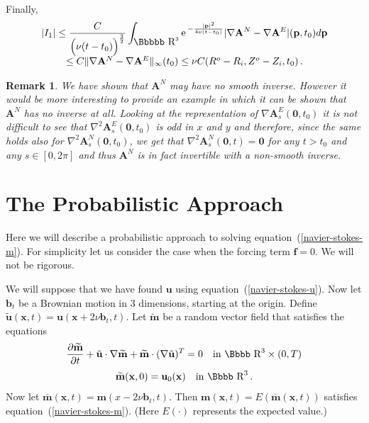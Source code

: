 \documentclass[12pt,twoside]{article}
\newcommand{\bA}{\mathbf{A}}
\newtheorem{rema}{Remark}[section]
\newcommand {\ee}{{\rm e}\,}
\newcommand {\rtt}{\mbox{\Bbbbb R}}
\newcommand {\rdd}{\mbox{\Bbbb R}}
\newcommand {\bnul}{{\mathbf {0}}}
\newcommand {\bu}{{\mathbf{u}}}
\newcommand {\bff}{{\mathbf{f}}}
\newcommand {\bx}{{\mathbf{x}}}
\newcommand {\bm}{{\mathbf{m}}}
\newcommand {\bb}{{\mathbf{b}}}
\newcommand {\bp}{{\mathbf{p}}}
\newcommand {\pder}[2]{\frac {\partial #1}{\partial #2}}
\def\kondemo{\hfill \vrule width7pt height7pt depth0pt}
\begin{document}
Finally,
$$
\begin{array}{c}
\displaystyle |I_1|  \leq \frac{C}{\Big(\nu(t-t_0)\Big)^{\frac 32}} \int_{\rtt^3} \ee^{-\frac
{|\bp|^2}{4\nu (t-t_0)}} |\nabla \bA^N - \nabla \bA^E|(\bp,t_0) d\bp \\[6pt]
\leq
C \|\nabla \bA^N - \nabla \bA^E\|_\infty(t_0) \leq \nu C(R^o-R_i, Z^o-Z_i, t_0)\,.
\end{array}
$$
\kondemo

\begin{rema} \label {r 5.2}
{\rm We have shown that $\bA^N$ may have no smooth inverse.  However it would be
more interesting to provide an example in which it can be shown that
$\bA^N$ has no inverse at all.
Looking at the representation of $\nabla \bA^E_s(\bnul, t_0)$ it is not 
difficult to see 
that $\nabla^2 \bA_s^E(\bnul, t_0)$ is odd in $x$ and $y$ and therefore, 
since
the same holds also for $\nabla^2 \bA_s^N(\bnul, t_0)$, we get
that  $\nabla^2 \bA_s^N(\bnul, t) = \bnul$ for any $t>t_0$ and any $s \in 
[0,2\pi]$ and thus
$\bA^N$ is in fact invertible with a non-smooth inverse.}
\end{rema}




\setcounter{equation}{0}
\section{The Probabilistic Approach}

Here we will describe a probabilistic approach to solving 
equation~(\ref{navier-stokes-m}).  For simplicity let us
consider the case when the forcing term $\bff = 0$.  
We will not be rigorous.

We will
suppose that we have found $\bu$ using equation~(\ref{navier-stokes-u}).
Now let $\bb_t$ be a Brownian motion in 3 dimensions, starting at
the origin.  Define $\tilde\bu(\bx,t) = \bu(\bx + 2\nu \bb_t,t)$.
Let $\widetilde \bm$ be a random vector field that satisfies
the equations
\begin{equation} \label{euler-tilde-m} 
\begin{array}{c}
\displaystyle \pder{\widetilde\bm}{t} + \tilde\bu\cdot \nabla \widetilde\bm 
  + \widetilde\bm \cdot (\nabla \tilde\bu)^T = 
  0
\quad {\rm in \ } \rdd^3 \times (0,T) \\[10pt]
\widetilde \bm(\bx,0) = \bu_0(\bx) \quad {\rm in \ } \rdd^3\, .
\end{array}
\end{equation}
Now let $\overline\bm(\bx,t) = \bm(x-2\nu\bb_t,t)$.  Then
$\bm(\bx,t) = E(\overline\bm(\bx,t))$ satisfies 
equation~(\ref{navier-stokes-m}).
(Here $E(\cdot)$ represents the expected value.)
\end{document}
